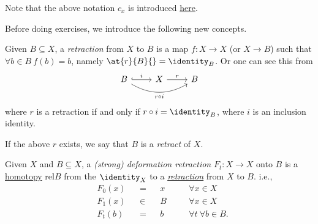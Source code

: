 \begin{remark}
	Note that the above notation \(c _{x} \) is introduced \hyperref[not:constant-loop]{here}.
\end{remark}

\begin{definition*}
	Before doing exercises, we introduce the following new concepts.
	\begin{definition}[Retraction]\label{def:retraction}
		Given \(B\subseteq X\), a \emph{retraction} from \(X\) to \(B\) is a map \(f\colon X\to X\) (or \(X\to B\))
		such that \(\forall b\in B\ f(b) = b\), namely \(\at{r}{B}{} = \identity_B\). Or one can see this from
		\[
			\begin{tikzcd}
				B \ar[rr, swap, bend right=30, "r \circ i"] \ar[r,hook,"i"] & X \ar[r, "r"] & B
			\end{tikzcd}
		\]
		where \(r\) is a retraction if and only if \(r\circ i = \identity_B\), where \(i\) is an inclusion identity.
	\end{definition}

	\begin{definition}[Retract]\label{def:retract}
		If the above \(r\) exists, we say that \(B\) is a \emph{retract} of \(X\).
	\end{definition}

	\begin{definition}\label{def:deformation-retraction}
		Given \(X\) and \(B\subseteq X\), a \emph{(strong) deformation retraction} \(F_t\colon X\to X\) onto \(B\) is
		a \hyperref[def:homotopy]{homotopy} \(\mathrm{rel} B\) from the \(\identity_X\) to a \hyperref[def:retraction]{\emph{retraction}}
		from \(X\) to \(B\). i.e.,
		\[
			\begin{alignedat}{4}
				&F_0(x) &&= &&x\quad &&\forall x\in X\\
				&F_1(x) &&\in &&B\quad &&\forall x\in X\\
				&F_t(b) &&= &&b\quad &&\forall t\ \forall b\in B.
			\end{alignedat}
		\]
	\end{definition}
\end{definition*}

